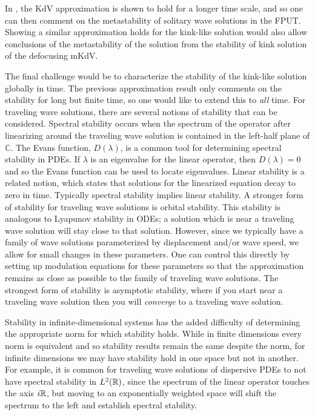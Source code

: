 In \cite{khan2017long}, the KdV approximation is shown to hold for a longer time scale, and so one can then comment on the metastability of solitary wave solutions in the FPUT. Showing a similar approximation holds for the kink-like solution would also allow conclusions of the metastability of the solution from the stability of kink solution of the defocusing mKdV.

The final challenge would be to characterize the stability of the kink-like solution globally in time. The previous approximation result only comments on the stability for long but finite time, so one would like to extend this to \emph{all} time. For traveling wave solutions, there are several notions of stability that can be considered. Spectral stability occurs when the spectrum of the operator after linearizing around the traveling wave solution is contained in the left-half plane of \(\mathbb C\). The Evans function, \(D(\lambda)\), is a common tool for determining spectral stability in PDEs. If \(\lambda\) is an eigenvalue for the linear operator, then \(D(\lambda) = 0\) and so the Evans function can be used to locate eigenvalues. Linear stability is a related notion, which states that solutions for the linearized equation decay to zero in time. Typically spectral stability implies linear stability. A stronger form of stability for traveling wave solutions is orbital stability. This stability is analogous to Lyapunov stability in ODEs; a solution which is near a traveling wave solution will stay close to that solution. However, since we typically have a family of wave solutions parameterized by displacement and/or wave speed, we allow for small changes in these parameters. One can control this directly by setting up modulation equations for these parameters so that the approximation remains as close as possible to the family of traveling wave solutions. The strongest form of stability is asymptotic stability, where if you start near a traveling wave solution then you will \emph{converge} to a traveling wave solution.

Stability in infinite-dimensional systems has the added difficulty of determining the appropriate norm for which stability holds. While in finite dimensions every norm is equivalent and so stability results remain the same despite the norm, for infinite dimensions we may have stability hold in one space but not in another.  For example, it is common for traveling wave solutions of dispersive PDEs to not have spectral stability in \(L^2(\mathbb{R})\), since the spectrum of the linear operator touches the axis \(i \mathbb{R}\), but moving to an exponentially weighted space will shift the spectrum to the left and establish spectral stability.

